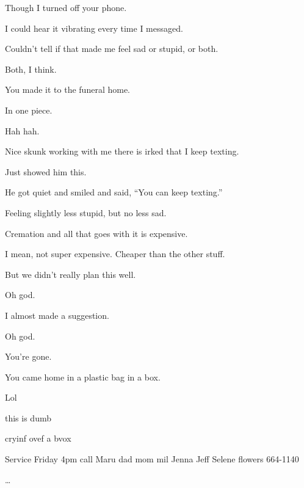 { Though I turned off your phone.

 I could hear it vibrating every time I messaged.

 Couldn't tell if that made me feel sad or stupid, or both.

 Both, I think.

\nopagebreak

 You made it to the funeral home.

 In one piece.

 Hah hah.

 Nice skunk working with me there is irked that I keep texting.

 Just showed him this.

 He got quiet and smiled and said, ``You can keep texting.''

 Feeling slightly less stupid, but no less sad.

 Cremation and all that goes with it is expensive.

 I mean, not super expensive. Cheaper than the other stuff.

 But we didn't really plan this well.

 Oh god.

 I almost made a suggestion.

 Oh god.

 You're gone.

\nopagebreak

 You came home in a plastic bag in a box.

 Lol

 this is dumb

 cryinf ovef a bvox

 Service Friday 4pm call Maru dad mom mil Jenna Jeff Selene flowers 664-1140

\ldots{}

}
